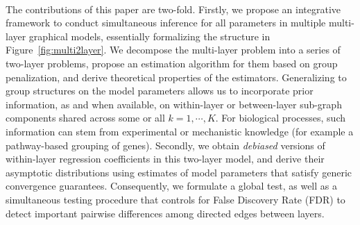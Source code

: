 \paragraph{}
%

The contributions of this paper are two-fold. Firstly, we propose an integrative framework to conduct simultaneous inference for all parameters in multiple multi-layer graphical models, essentially formalizing the structure in Figure~\ref{fig:multi2layer}. We decompose the multi-layer problem into a series of two-layer problems, propose an estimation algorithm for them based on group penalization, and derive theoretical properties of the estimators. Generalizing to group structures on the model parameters allows us to incorporate prior information, as and when available, on within-layer or between-layer sub-graph components shared across some or all $k=1,\cdots,K$. For biological processes, such information can stem from experimental or mechanistic knowledge (for example a pathway-based grouping of genes). Secondly, we obtain {\em debiased} versions of within-layer regression coefficients in this two-layer model, and derive their asymptotic distributions using estimates of model parameters that satisfy generic convergence guarantees. Consequently, we formulate a global test, as well as a simultaneous testing procedure that controls for False Discovery Rate (FDR) to detect important pairwise differences among directed edges between layers.

